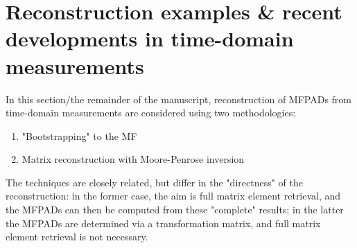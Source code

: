 \section{Reconstruction examples & recent developments in time-domain measurements}

In this section/the remainder of the manuscript, reconstruction of MFPADs from time-domain measurements are considered using two methodologies:

\begin{enumerate}
\item "Bootstrapping" to the MF \cite{hockett2018QMP1,hockett2018QMP2,marceau2017MolecularFrameReconstruction}
\item Matrix reconstruction with Moore-Penrose inversion \cite{gregory2021MolecularFramePhotoelectron}
\end{enumerate}

The techniques are closely related, but differ in the "directness" of the reconstruction: in the former case, the aim is full matrix element retrieval, and the MFPADs can then be computed from these "complete" results; in the latter the MFPADs are determined via a transformation matrix, and full matrix element retrieval is not necessary.